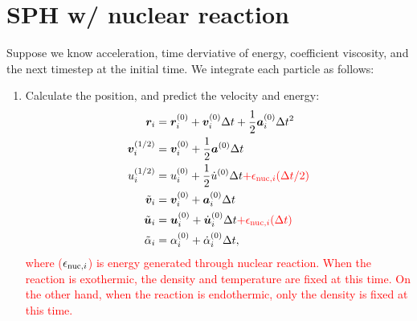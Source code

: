 \documentclass[fleqn,dvipdfmx]{article}
\newcommand{\redtext}[1]{\textcolor{red}{#1}}
\begin{document}
\section{SPH w/ nuclear reaction}

Suppose we know acceleration, time derviative of energy, coefficient
viscosity, and the next timestep at the initial time. We integrate
each particle as follows:
\begin{enumerate}
\item Calculate the position, and predict the velocity and energy:
  \begin{align}
    \bm{r}_{i} &= \bm{r}^{(0)}_i + \bm{v}^{(0)}_i \Delta t +
    \frac{1}{2} \bm{a}^{(0)}_i \Delta t^2 \\
    \bm{v}^{(1/2)}_i &= \bm{v}^{(0)}_i + \frac{1}{2} \bm{a}^{(0)}
    \Delta t \\
    u^{(1/2)}_i &= u^{(0)}_i + \frac{1}{2} \dot{u}^{(0)} \Delta t
    \redtext{+ \epsilon_{{\rm nuc},i}(\Delta t/2)} \\
    \tilde{\bm{v}}_{i} &= \bm{v}^{(0)}_i + \bm{a}^{(0)}_i \Delta t \\
    \tilde{\bm{u}}_{i} &= \bm{u}^{(0)}_i + \dot{\bm{u}}^{(0)}_i \Delta
    t \redtext{+ \epsilon_{{\rm nuc},i}(\Delta t)} \\
    \tilde{\alpha}_i &= \alpha^{(0)}_i + \dot{\alpha}^{(0)}_i \Delta t,
  \end{align}
  \redtext{where ($\epsilon_{{\rm nuc},i}$) is energy generated
    through nuclear reaction. When the reaction is exothermic, the
    density and temperature are fixed at this time. On the other hand,
    when the reaction is endothermic, only the density is fixed at
    this time.}


\end{enumerate}
\end{document}
